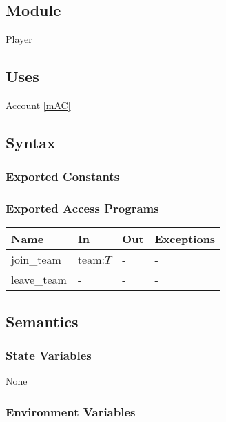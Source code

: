\documentclass[12pt, titlepage]{article}
\begin{document}


\subsection{Module}

Player

\subsection{Uses}

Account \ref{mAC}

\subsection{Syntax}

\subsubsection{Exported Constants}

\subsubsection{Exported Access Programs}

\begin{center}
\begin{tabular}{p{2cm} p{4cm} p{4cm} p{2cm}}
\hline
\textbf{Name} & \textbf{In} & \textbf{Out} & \textbf{Exceptions} \\
\hline
join\_team & team:$T$ & - & - \\
leave\_team & - & - & - \\
\hline
\end{tabular}
\end{center}

\subsection{Semantics}

\subsubsection{State Variables}

None

\subsubsection{Environment Variables}
\end{document}
